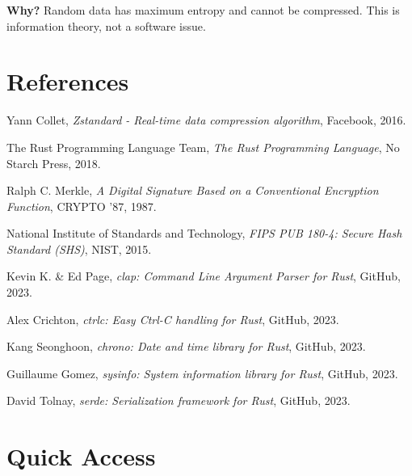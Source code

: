 \documentclass[11pt,a4paper]{article}
\begin{document}
	\textbf{Why?} Random data has maximum entropy and cannot be compressed. This is information theory, not a software issue.

	\section{References}
	\label{sec:references}

	\begin{thebibliography}{9}

	Yann Collet,
	\textit{Zstandard - Real-time data compression algorithm},
	Facebook, 2016.

	The Rust Programming Language Team,
	\textit{The Rust Programming Language},
	No Starch Press, 2018.

	Ralph C. Merkle,
	\textit{A Digital Signature Based on a Conventional Encryption Function},
	CRYPTO '87, 1987.

	National Institute of Standards and Technology,
	\textit{FIPS PUB 180-4: Secure Hash Standard (SHS)},
	NIST, 2015.

	Kevin K. \& Ed Page,
	\textit{clap: Command Line Argument Parser for Rust},
	GitHub, 2023.

	Alex Crichton,
	\textit{ctrlc: Easy Ctrl-C handling for Rust},
	GitHub, 2023.

	Kang Seonghoon,
	\textit{chrono: Date and time library for Rust},
	GitHub, 2023.

	Guillaume Gomez,
	\textit{sysinfo: System information library for Rust},
	GitHub, 2023.

	David Tolnay,
	\textit{serde: Serialization framework for Rust},
	GitHub, 2023.

	\end{thebibliography}

	\section{Quick Access}
	\label{sec:quickaccess}

	\begin{center}
	\end{center}
\end{document}
